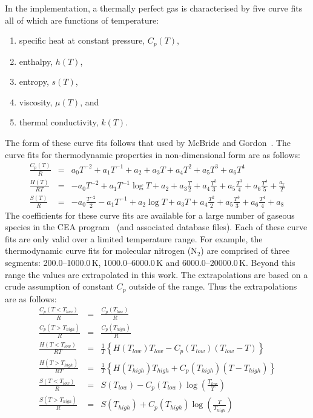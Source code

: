 \medskip
In the implementation, a thermally perfect gas is characterised
by five curve fits all of which are functions of temperature:
\begin{enumerate}
   \item specific heat at constant pressure, $C_p(T)$,
   \item enthalpy, $h(T)$,
   \item entropy, $s(T)$,
   \item viscosity, $\mu(T)$, and
   \item thermal conductivity, $k(T)$.
\end{enumerate}
The form of these curve fits follows that used by
McBride and Gordon~\cite{mcbride_gordon_96}.
The curve fits for thermodynamic properties
in non-dimensional form are as follows:
\begin{eqnarray}
 \frac{C_p(T)}{R} & = & a_0 T^{-2} + a_1 T^{-1} + a_2 + a_3 T + a_4 T^2 + a_5 T^3 + a_6 T^4 \\
 \frac{H(T)}{RT} & = & -a_0 T^{-2} + a_1 T^{-1} \log{T} + a_2 + a_3 \frac{T}{2} +
                        a_4 \frac{T^2}{3} + a_5 \frac{T^3}{4} + a_6 \frac{T^4}{5} + \frac{a_7}{T} \\
 \frac{S(T)}{R} & = & -a_0 \frac{T^{-2}}{2} - a_1 T^{-1} + a_2 \log{T} + a_3 T + a_4 \frac{T^2}{2}  +
                        a_5 \frac{T^{3}}{3} + a_6 \frac{T^4}{4} + a_8
\end{eqnarray}
The coefficients for these curve fits are available for a large number of gaseous species in
the CEA program~\cite{mcbride_gordon_96} (and associated database files).
Each of these curve fits are only valid over a limited temperature range.
For example, the thermodynamic curve fits for molecular nitrogen (N$_2$) are comprised of three
segments: 200.0--1000.0\,K, 1000.0--6000.0\,K and 6000.0--20000.0\,K.
Beyond this range the values are extrapolated in this work.
The extrapolations are based on a crude assumption of constant $C_p$ outside of the
range.
Thus the extrapolations are as follows:
\begin{eqnarray*}
  \frac{C_p(T < T_{low})}{R} & = & \frac{C_p(T_{low})}{R}\\
  \frac{C_p(T > T_{high})}{R} & = & \frac{C_p(T_{high} )}{R} \\
  \frac{H(T < T_{low})}{RT} & = & \frac{1}{T} \left\lbrace H(T_{low})T_{low} - C_p(T_{low})( T_{low} - T ) \right\rbrace  \\
  \frac{H(T > T_{high})}{RT} & = & \frac{1}{T} \left\lbrace H(T_{high})T_{high} + C_p(T_{high})( T - T_{high}) \right\rbrace \\
  \frac{S(T < T_{low})}{R} & = & S(T_{low}) - C_p(T_{low}) \log{\left( \frac{T_{low}}{T}\right) }  \\
  \frac{S(T > T_{high})}{R} & = & S(T_{high}) + C_p(T_{high}) \log{\left( \frac{T}{T_{high}}\right) }
\end{eqnarray*}

